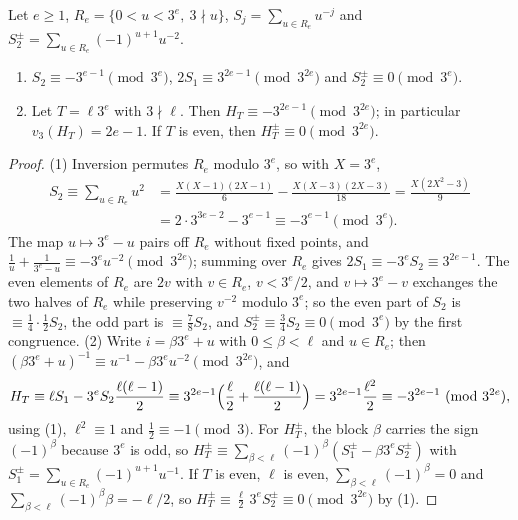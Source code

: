 \documentclass[11pt]{amsart}
\begin{document}
\begin{lemma}[harmonic sums at $p=3$]\label{lem:defect}
Let $e\ge1$, $R_e=\{0<u<3^e,\ 3\nmid u\}$, $S_j=\sum_{u\in R_e}u^{-j}$ and $S_2^\pm=\sum_{u\in R_e}(-1)^{u+1}u^{-2}$.
\begin{enumerate}
\item $S_2\equiv-3^{e-1}\pmod{3^e}$, $2S_1\equiv3^{2e-1}\pmod{3^{2e}}$ and $S_2^\pm\equiv0\pmod{3^e}$.
\item Let $T=\ell3^e$ with $3\nmid\ell$. Then $H_T\equiv-3^{2e-1}\pmod{3^{2e}}$; in particular $v_3(H_T)=2e-1$. If $T$ is even, then $H_T^\pm\equiv0\pmod{3^{2e}}$.
\end{enumerate}
\end{lemma}
\begin{proof}
(1) Inversion permutes $R_e$ modulo $3^e$, so with $X=3^e$,
\begin{align*} S_2\equiv\sum_{u\in R_e}u^2&=\frac{X(X-1)(2X-1)}6-\frac{X(X-3)(2X-3)}{18}=\frac{X(2X^2-3)}9\\ &=2\cdot3^{3e-2}-3^{e-1}\equiv-3^{e-1}\pmod{3^e}. \end{align*}
The map $u\mapsto3^e-u$ pairs off $R_e$ without fixed points, and $\frac1u+\frac1{3^e-u}\equiv-3^eu^{-2}\pmod{3^{2e}}$; summing over $R_e$ gives $2S_1\equiv-3^eS_2\equiv3^{2e-1}$. The even elements of $R_e$ are $2v$ with $v\in R_e$, $v<3^e/2$, and $v\mapsto3^e-v$ exchanges the two halves of $R_e$ while preserving $v^{-2}$ modulo $3^e$; so the even part of $S_2$ is $\equiv\frac14\cdot\frac12S_2$, the odd part is $\equiv\frac78S_2$, and $S_2^\pm\equiv\frac34S_2\equiv0\pmod{3^e}$ by the first congruence.
(2) Write $i=\beta3^e+u$ with $0\le\beta<\ell$ and $u\in R_e$; then $(\beta3^e+u)^{-1}\equiv u^{-1}-\beta3^eu^{-2}\pmod{3^{2e}}$, and
\[ H_T\equiv\ell S_1-3^eS_2\frac{\ell(\ell-1)}2\equiv3^{2e-1}\Bigl(\frac\ell2+\frac{\ell(\ell-1)}2\Bigr)=3^{2e-1}\frac{\ell^2}2\equiv-3^{2e-1}\pmod{3^{2e}}, \]
using (1), $\ell^2\equiv1$ and $\frac12\equiv-1\pmod3$. For $H_T^\pm$, the block $\beta$ carries the sign $(-1)^\beta$ because $3^e$ is odd, so $H_T^\pm\equiv\sum_{\beta<\ell}(-1)^\beta(S_1^\pm-\beta3^eS_2^\pm)$ with $S_1^\pm=\sum_{u\in R_e}(-1)^{u+1}u^{-1}$. If $T$ is even, $\ell$ is even, $\sum_{\beta<\ell}(-1)^\beta=0$ and $\sum_{\beta<\ell}(-1)^\beta\beta=-\ell/2$, so $H_T^\pm\equiv\frac\ell2\,3^eS_2^\pm\equiv0\pmod{3^{2e}}$ by (1).
\end{proof}
\end{document}
